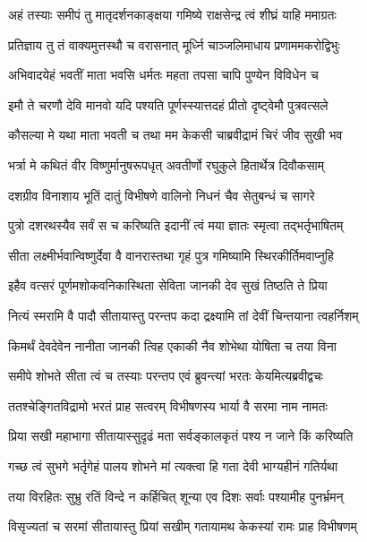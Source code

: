 \twolineshloka
{अहं तस्याः समीपं तु मातृदर्शनकाङ्क्षया}
{गमिष्ये राक्षसेन्द्र त्वं शीघ्रं याहि ममाग्रतः}%

\twolineshloka
{प्रतिज्ञाय तु तं वाक्यमुत्तस्थौ च वरासनात्}
{मूर्ध्नि चाञ्जलिमाधाय प्रणाममकरोद्विभुः}%

\twolineshloka
{अभिवादयेहं भवतीं माता भवसि धर्मतः}
{महता तपसा चापि पुण्येन विविधेन च}%

\twolineshloka
{इमौ ते चरणौ देवि मानवो यदि पश्यति}
{पूर्णस्स्यात्तदहं प्रीतो दृष्ट्वेमौ पुत्रवत्सले}%

\twolineshloka
{कौसल्या मे यथा माता भवती च तथा मम}
{केकसी चाब्रवीद्रामं चिरं जीव सुखी भव}%

\twolineshloka
{भर्त्रा मे कथितं वीर विष्णुर्मानुषरूपधृत्}
{अवतीर्णो रघुकुले हितार्थेत्र दिवौकसाम्}%

\twolineshloka
{दशग्रीव विनाशाय भूतिं दातुं विभीषणे}
{वालिनो निधनं चैव सेतुबन्धं च सागरे}%

\twolineshloka
{पुत्रो दशरथस्यैव सर्वं स च करिष्यति}
{इदानीं त्वं मया ज्ञातः स्मृत्वा तद्भर्तृभाषितम्}%

\twolineshloka
{सीता लक्ष्मीर्भवान्विष्णुर्देवा वै वानरास्तथा}
{गृहं पुत्र गमिष्यामि स्थिरकीर्तिमवाप्नुहि}%


\twolineshloka
{इहैव वत्सरं पूर्णमशोकवनिकास्थिता}
{सेविता जानकी देव सुखं तिष्ठति ते प्रिया}%

\twolineshloka
{नित्यं स्मरामि वै पादौ सीतायास्तु परन्तप}
{कदा द्रक्ष्यामि तां देवीं चिन्तयाना त्वहर्निशम्}%

\twolineshloka
{किमर्थं देवदेवेन नानीता जानकी त्विह}
{एकाकी नैव शोभेथा योषिता च तया विना}%

\twolineshloka
{समीपे शोभते सीता त्वं च तस्याः परन्तप}
{एवं ब्रुवन्त्यां भरतः केयमित्यब्रवीद्वचः}%

\twolineshloka
{ततश्चेङ्गितविद्रामो भरतं प्राह सत्वरम्}
{विभीषणस्य भार्या वै सरमा नाम नामतः}%

\twolineshloka
{प्रिया सखी महाभागा सीतायास्सुदृढं मता}
{सर्वङ्कालकृतं पश्य न जाने किं करिष्यति}%

\twolineshloka
{गच्छ त्वं सुभगे भर्तृगेहं पालय शोभने}
{मां त्यक्त्वा हि गता देवी भाग्यहीनं गतिर्यथा}%

\twolineshloka
{तया विरहितः सुभ्रु रतिं विन्दे न कर्हिचित्}
{शून्या एव दिशः सर्वाः पश्यामीह पुनर्भ्रमन्}%

\twolineshloka
{विसृज्यतां च सरमां सीतायास्तु प्रियां सखीम्}
{गतायामथ केकस्यां रामः प्राह विभीषणम्}%

